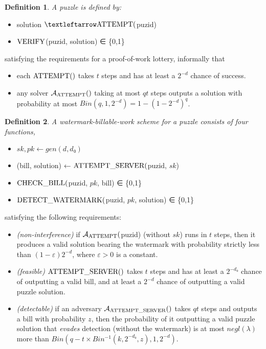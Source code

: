 \documentclass{article}
\newtheorem{definition}{Definition}
\newcommand{\adv}{\mathcal{A}}
\newcommand{\tn}{\textnormal}
\newcommand{\unn}[1]{\uppercase\tn{#1}}
\begin{document}
\begin{definition}A puzzle is defined by:
\end{definition}
\begin{itemize}
\item solution $← \unn{attempt}($puzid)
\item  $\unn{verify}$(puzid, solution) ∈ \{0,1\}
\end{itemize}

satisfying the requirements for a proof-of-work lottery, informally that
\begin{itemize}
\item each $\unn{attempt}()$ takes $t$ steps and has at least a $2^{-d}$ chance of success.
\item any solver $\adv_{\unn{attempt}}()$ taking at most $qt$ steps outputs a solution with probability at most $Bin(q,1,2^{-d}) = 1-(1-2^{-d})^q$.
\end{itemize}


\begin{definition}A watermark-billable-work scheme for a puzzle consists of four functions,
\end{definition}
\begin{itemize}
\item $sk,pk ← gen(d,d₀)$
\item (bill, solution) ← $\unn{attempt\_server}($puzid, $sk$)
\item $\unn{check\_bill}($puzid, $pk$, bill) ∈ \{0,1\}
\item $\unn{detect\_watermark}($puzid, $pk$, solution) ∈ \{0,1\}
\end{itemize}
satisfying the following requirements:
\begin{itemize}
\item {\em (non-interference)} if $\adv_{\unn{attempt}}($puzid) (without $sk$) runs in $t$ steps, then it produces a valid solution bearing the watermark with probability strictly less than $(1-ε)2^{-d}$, where $ε>0$ is a constant.
\item {\em (feasible)} $\unn{attempt\_server}()$ takes $t$ steps and has at least a $2^{-d₀}$ chance of outputting a valid bill, and at least a $2^{-d}$ chance of outputting a valid puzzle solution.
\item {\em (detectable)} if an adversary $\adv_{\unn{attempt\_server}}()$ takes $qt$ steps and outputs a bill with probability $z$, then the probability of it outputting a valid puzzle solution that {\em evades} detection  (without the watermark) is at most $negl(λ)$ more than $Bin(q-t×Bin^{-1}(k,2^{-d₀},z), 1, 2^{-d})$.
\end{itemize}
\end{document}
